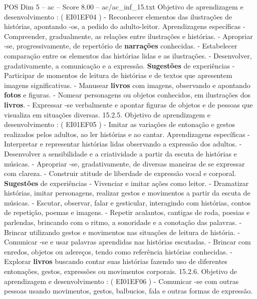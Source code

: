 \begin{textsample}{POS Dim 5 – ac – Score 8.00 – ac/ac\_inf\_15.txt}
Objetivo de aprendizagem e desenvolvimento : ( EI01EF04 ) - Reconhecer elementos das ilustrações de histórias, apontando -os, a pedido do adulto-leitor.
Aprendizagens específicas - Compreender, gradualmente, as relações entre ilustrações e histórias. - Apropriar -se, progressivamente, de repertório de \textbf{narrações} conhecidas. - Estabelecer comparação entre os elementos das histórias lidas e as ilustrações. - Desenvolver, gradativamente, a comunicação e a expressão. \textbf{Sugestões} de experiências - Participar de momentos de leitura de histórias e de textos que apresentem imagens significativas. - Manusear \textbf{livros} com imagens, observando e apontando \textbf{fotos} e figuras. - Nomear personagens ou objetos conhecidos, em ilustrações dos \textbf{livros}. - Expressar -se verbalmente e apontar figuras de objetos e de pessoas que visualiza em situações diversas. 15.2.5.
Objetivo de aprendizagem e desenvolvimento : ( EI01EF05 ) - Imitar as variações de entonação e gestos realizados pelos adultos, ao ler histórias e ao cantar.
Aprendizagens específicas - Interpretar e representar histórias lidas observando a expressão dos adultos. - Desenvolver a sensibilidade e a criatividade a partir da escuta de histórias e músicas. - Apropriar -se, gradativamente, de diversas maneiras de se expressar com clareza. - Construir atitude de liberdade de expressão vocal e corporal. \textbf{Sugestões} de experiências - Vivenciar e imitar ações como leitor. - Dramatizar histórias, imitar personagens, realizar gestos e movimentos a partir da escuta de músicas. - Escutar, observar, falar e gesticular, interagindo com histórias, contos de repetição, poemas e imagens. - Repetir acalantos, cantigas de roda, poesias e parlendas, brincando com o ritmo, a sonoridade e a conotação das palavras. - Brincar utilizando gestos e movimentos nas situações de leitura de história. - Comunicar -se e usar palavras aprendidas nas histórias escutadas. - Brincar com enredos, objetos ou adereços, tendo como referência histórias conhecidas. - Explorar \textbf{livros} buscando contar suas histórias fazendo uso de diferentes entonações, gestos, expressões ou movimentos corporais. 15.2.6.
Objetivo de aprendizagem e desenvolvimento : ( EI01EF06 ) - Comunicar -se com outras pessoas usando movimentos, gestos, balbucios, fala e outras formas de expressão.

\end{textsample}
